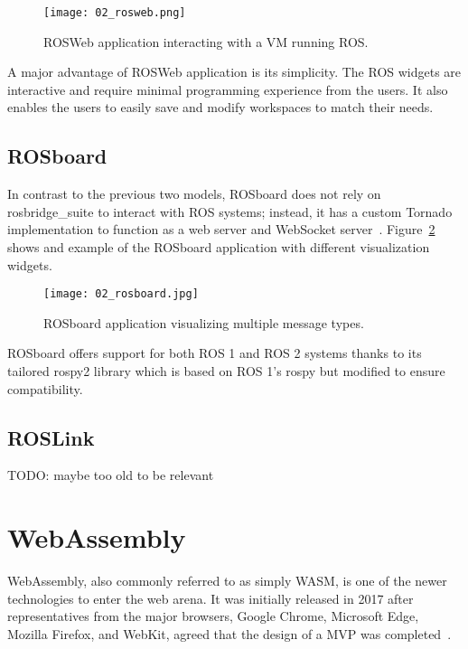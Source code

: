         \begin{figure}[htbp]
            \centering
            \texttt{[image: 02\_rosweb.png]}
            \caption{ROSWeb application interacting with a \ac{VM} running \ac{ROS}.}
            \label{fig:rosweb}
        \end{figure}

        A major advantage of ROSWeb application is its simplicity. The \ac{ROS} widgets are interactive and require minimal programming experience from the users. It also enables the users to easily save and modify workspaces to match their needs.

    \subsection{ROSboard}

        In contrast to the previous two models, ROSboard does not rely on \textsf{rosbridge\_suite} to interact with \ac{ROS} systems; instead, it has a custom \textsf{Tornado} implementation to function as a web server and WebSocket server~\cite{rosboard}. Figure~\ref{fig:rosboard} shows and example of the ROSboard application with different visualization widgets.

        \begin{figure}[htbp]
            \centering
            \texttt{[image: 02\_rosboard.jpg]}
            \caption{ROSboard application visualizing multiple message types.}
            \label{fig:rosboard}
        \end{figure}

        ROSboard offers support for both \ac{ROS} 1 and \ac{ROS} 2 systems thanks to its tailored \textsf{rospy2} library which is based on \ac{ROS} 1's \textsf{rospy} but modified to ensure compatibility.

    \subsection{ROSLink}

    TODO: maybe too old to be relevant

    \pagebreak

\section{WebAssembly}

    WebAssembly, also commonly referred to as simply WASM, is one of the newer technologies to enter the web arena. It was initially released in 2017 after representatives from the major browsers, Google Chrome, Microsoft Edge, Mozilla Firefox, and WebKit, agreed that the design of a \ac{MVP} was completed~\cite{krill}.

